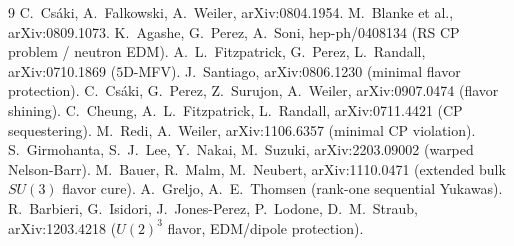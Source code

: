 \documentclass[11pt]{article}
\begin{document}
\begin{thebibliography}{9}
\small
{} C.~Cs\'aki, A.~Falkowski, A.~Weiler, arXiv:0804.1954.
 M.~Blanke et al., arXiv:0809.1073.
 K.~Agashe, G.~Perez, A.~Soni, hep-ph/0408134 (RS CP problem / neutron EDM).
 A.~L.~Fitzpatrick, G.~Perez, L.~Randall, arXiv:0710.1869 ($5$D-MFV).
 J.~Santiago, arXiv:0806.1230 (minimal flavor protection).
 C.~Cs\'aki, G.~Perez, Z.~Surujon, A.~Weiler, arXiv:0907.0474 (flavor shining).
 C.~Cheung, A.~L.~Fitzpatrick, L.~Randall, arXiv:0711.4421 (CP sequestering).
 M.~Redi, A.~Weiler, arXiv:1106.6357 (minimal CP violation).
 S.~Girmohanta, S.~J.~Lee, Y.~Nakai, M.~Suzuki, arXiv:2203.09002 (warped Nelson-Barr).
 M.~Bauer, R.~Malm, M.~Neubert, arXiv:1110.0471 (extended bulk $SU(3)$ flavor cure).
 A.~Greljo, A.~E.~Thomsen (rank-one sequential Yukawas).
 R.~Barbieri, G.~Isidori, J.~Jones-Perez, P.~Lodone, D.~M.~Straub, arXiv:1203.4218 ($U(2)^3$ flavor, EDM/dipole protection).
\end{thebibliography}
\end{document}
